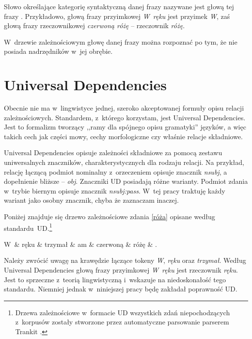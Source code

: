 Słowo określające kategorię syntaktyczną danej frazy nazywane jest głową tej frazy \citep{hoeksema1992head}. Przykładowo, głową frazy przyimkowej \emph{W~ręku} jest przyimek \emph{W}, zaś głową frazy rzeczownikowej \emph{czerwoną różę} -- rzeczownik \emph{różę}. 

W~drzewie zależnościowym głowę danej frazy można rozpoznać po tym, że nie posiada nadrzędników w~jej obrębie.

\section{Universal Dependencies}

Obecnie nie ma w~lingwistyce jednej, szeroko akceptowanej formuły opisu relacji zależnościowych. Standardem, z~którego korzystam, jest Universal Dependencies. Jest to formalizm tworzący ,,ramy dla spójnego opisu gramatyki'' \citep{de2021universal} języków, a więc takich cech jak części mowy, cechy morfologiczne czy właśnie relacje składniowe. 

Universal Dependencies opisuje zależności składniowe za pomocą zestawu uniwersalnych znaczników, charakterystycznych dla rodzaju relacji. Na przykład, relację łączącą podmiot nominalny z~orzeczeniem opisuje znacznik \emph{nsubj}, a dopełnienie bliższe -- \emph{obj}. Znaczniki UD posiadają różne warianty. Podmiot zdania w~trybie biernym opisuje znacznik \emph{nsubj:pass}. W~tej pracy traktuję każdy wariant jako osobny znacznik, chyba że zaznaczam inaczej.

Poniżej znajduje się drzewo zależnościowe zdania \eqref{róża} opisane według standardu~UD.\footnote{Drzewa zależnościowe w~formacie UD wszystkich zdań niepochodzących z~korpusów zostały stworzone przez automatyczne parsowanie parserem Trankit \citep{van2021trankit}.}

\begin{exe}
\ex \label{róża-UD}
\begin{dependency}[baseline=-\the\dimexpr\fontdimen22\textfont2\relax]
\begin{deptext}[column sep=1em]
W~\& ręku \& trzymał \& am \& czerwoną \& różę \& .  \\ 
\end{deptext}
\end{dependency}
\end{exe}

Należy zwrócić uwagę na krawędzie łączące tokeny \emph{W}, \emph{ręku} oraz \emph{trzymał}. Według Universal Dependencies głową frazy przyimkowej \emph{W~ręku} jest rzeczownik \emph{ręku}. Jest to sprzeczne z~teorią lingwistyczną i~wskazuje na niedoskonałość tego standardu. Niemniej jednak w~niniejszej pracy będę zakładał poprawność UD.

